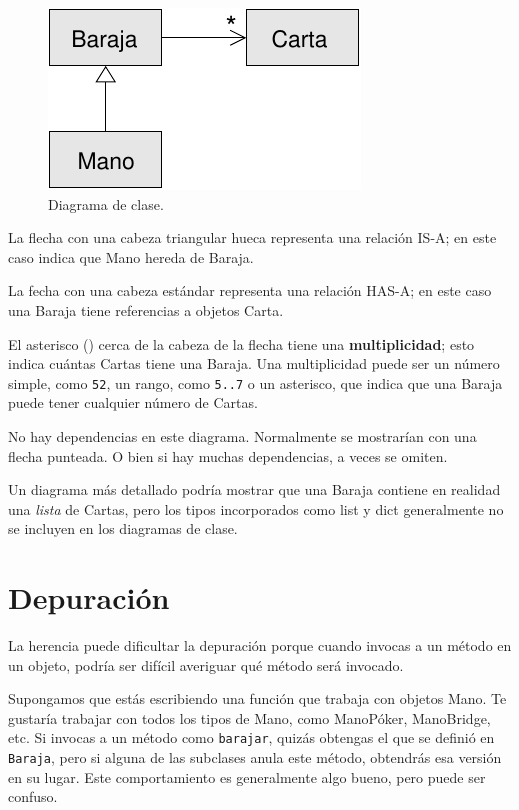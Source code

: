 \documentclass[10pt]{book}
\begin{document}
\begin{figure}
\centerline
{\includegraphics[scale=0.8]{figs/class1.pdf}}
\caption{Diagrama de clase.}
\label{fig.class1}
\end{figure}

La flecha con una cabeza triangular hueca representa una relación IS-A;
en este caso indica que Mano hereda
de Baraja.

La fecha con una cabeza estándar representa una relación HAS-A;
en este caso una Baraja tiene referencias a objetos
Carta.

El asterisco ({\tt *}) cerca de la cabeza de la flecha tiene una
{\bf multiplicidad}; esto indica cuántas Cartas tiene una Baraja.
Una multiplicidad puede ser un número simple, como {\tt 52}, un rango,
como {\tt 5..7} o un asterisco, que indica que una Baraja puede
tener cualquier número de Cartas.

No hay dependencias en este diagrama.  Normalmente se
mostrarían con una flecha punteada.  O bien si hay muchas
dependencias, a veces se omiten.

Un diagrama más detallado podría mostrar que una Baraja contiene
en realidad una {\em lista} de Cartas, pero los tipos incorporados
como list y dict generalmente no se incluyen en los diagramas de clase.


\section{Depuración}

La herencia puede dificultar la depuración porque cuando invocas a un
método en un objeto, podría ser difícil averiguar qué método
será invocado.

Supongamos que estás escribiendo una función que trabaja con objetos Mano.
Te gustaría trabajar con todos los tipos de Mano, como
ManoPóker, ManoBridge, etc.  Si invocas a un método como
{\tt barajar}, quizás obtengas el que se definió en {\tt Baraja},
pero si alguna de las subclases anula este método,
obtendrás esa versión en su lugar.  Este comportamiento es generalmente algo
bueno, pero puede ser confuso.
\end{document}
